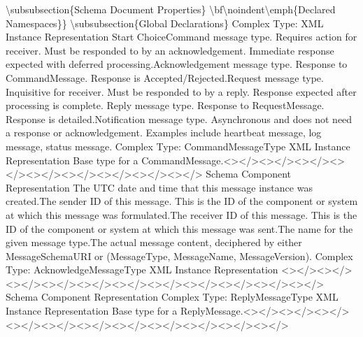 \textbackslash subsubsection\{Schema Document Properties\}
\textbackslash bf\textbackslash noindent\textbackslash emph\{Declared
Namespaces\}\} \textbackslash subsubsection\{Global Declarations\}
Complex Type: XML Instance Representation Start ChoiceCommand message
type. Requires action for receiver. Must be responded to by an
acknowledgement. Immediate response expected with deferred
processing.Acknowledgement message type. Response to CommandMessage.
Response is Accepted/Rejected.Request message type. Inquisitive for
receiver. Must be responded to by a reply. Response expected after
processing is complete. Reply message type. Response to RequestMessage.
Response is detailed.Notification message type. Asynchronous and does
not need a response or acknowledgement. Examples include heartbeat
message, log message, status message. Complex Type: CommandMessageType
XML Instance Representation Base type for a
CommandMessage.\textless\textgreater\textless/\textgreater\textless\textgreater\textless/\textgreater\textless\textgreater\textless/\textgreater\textless\textgreater\textless/\textgreater\textless\textgreater\textless/\textgreater\textless\textgreater\textless/\textgreater\textless\textgreater\textless/\textgreater\textless\textgreater\textless/\textgreater\textless\textgreater\textless/\textgreater{}
Schema Component Representation The UTC date and time that this message
instance was created.The sender ID of this message. This is the ID of
the component or system at which this message was formulated.The
receiver ID of this message. This is the ID of the component or system
at which this message was sent.The name for the given message type.The
actual message content, deciphered by either MessageSchemaURI or
(MessageType, MessageName, MessageVersion). Complex Type:
AcknowledgeMessageType XML Instance Representation
\textless\textgreater\textless/\textgreater\textless\textgreater\textless/\textgreater\textless\textgreater\textless/\textgreater\textless\textgreater\textless/\textgreater\textless\textgreater\textless/\textgreater\textless\textgreater\textless/\textgreater\textless\textgreater\textless/\textgreater\textless\textgreater\textless/\textgreater\textless\textgreater\textless/\textgreater\textless\textgreater\textless/\textgreater\textless\textgreater\textless/\textgreater{}
Schema Component Representation Complex Type: ReplyMessageType XML
Instance Representation Base type for a
ReplyMessage.\textless\textgreater\textless/\textgreater\textless\textgreater\textless/\textgreater\textless\textgreater\textless/\textgreater\textless\textgreater\textless/\textgreater\textless\textgreater\textless/\textgreater\textless\textgreater\textless/\textgreater\textless\textgreater\textless/\textgreater\textless\textgreater\textless/\textgreater\textless\textgreater\textless/\textgreater\textless\textgreater\textless/\textgreater\textless\textgreater\textless/\textgreater{}
